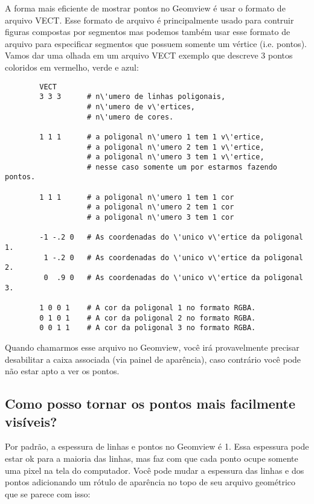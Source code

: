 \documentclass[12pt,a4paper]{article}
\begin{document}
        A forma mais eficiente de mostrar pontos no Geomview \'e usar o formato de
        arquivo VECT. Esse formato de arquivo \'e principalmente usado para contruir figuras compostas
        por segmentos mas podemos tamb\'em usar esse formato de arquivo para especificar segmentos que possuem somente
        um v\'ertice (i.e. pontos). Vamos dar uma olhada em um arquivo VECT exemplo que
        descreve 3 pontos coloridos em vermelho, verde e azul:
	\tiny
        \begin{verbatim}
        VECT
        3 3 3      # n\'umero de linhas poligonais,
                   # n\'umero de v\'ertices,
                   # n\'umero de cores.

        1 1 1      # a poligonal n\'umero 1 tem 1 v\'ertice,
                   # a poligonal n\'umero 2 tem 1 v\'ertice,
                   # a poligonal n\'umero 3 tem 1 v\'ertice,
                   # nesse caso somente um por estarmos fazendo pontos.

        1 1 1      # a poligonal n\'umero 1 tem 1 cor
                   # a poligonal n\'umero 2 tem 1 cor
                   # a poligonal n\'umero 3 tem 1 cor

        -1 -.2 0   # As coordenadas do \'unico v\'ertice da poligonal 1.
         1 -.2 0   # As coordenadas do \'unico v\'ertice da poligonal 2.
         0  .9 0   # As coordenadas do \'unico v\'ertice da poligonal 3.

        1 0 0 1    # A cor da poligonal 1 no formato RGBA.
        0 1 0 1    # A cor da poligonal 2 no formato RGBA.
        0 0 1 1    # A cor da poligonal 3 no formato RGBA.
        \end{verbatim}
        \normalsize
        Quando chamarmos esse arquivo no Geomview, voc\^e ir\'a provavelmente precisar desabilitar
        a caixa associada (via painel de apar\^encia), caso contr\'ario voc\^e pode n\~ao
        estar apto a ver os pontos.

    \subsection{Como posso tornar os pontos mais facilmente\\ vis\'iveis?}

        Por padr\~ao, a espessura de linhas e pontos no Geomview \'e 1. Essa espessura pode
        estar ok para a maioria das linhas, mas faz com que cada ponto ocupe somente uma
        pixel na tela do computador. Voc\^e pode mudar a espessura das linhas e dos pontos
        adicionando um r\'{o}tulo de apar\^encia no topo de seu arquivo geom\'etrico que se parece
        com isso:
\end{document}
